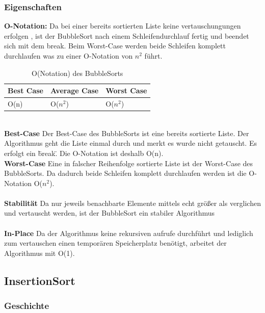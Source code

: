 \documentclass{article}
\begin{document}
\subsubsection{Eigenschaften}
\textbf{O-Notation:} Da bei einer bereits sortierten Liste keine vertauschungungen erfolgen , ist der BubbleSort nach einem Schleifendurchlauf fertig und beendet sich mit dem break. Beim Worst-Case werden beide Schleifen komplett durchlaufen was zu einer O-Notation von $n^{2}$ führt.
\begin{table}[h]
\centering
\begin{tabular}{lll}
	\hline
	\textbf{Best Case} & \textbf{Average Case} & \textbf{Worst Case} \\
	\hline
	O(n) & O($n^{2}$) & O($n^{2}$) \\
	\hline
\end{tabular}
\caption{O(Notation) des BubbleSorts \cite{ONotationen}}
\label{tab:bubbleSort}
\end{table}
\\\textbf{Best-Case} Der Best-Case des BubbleSorts ist eine bereits sortierte Liste. Der Algorithmus geht die Liste einmal durch und merkt es wurde nicht getauscht. Es erfolgt ein \"break\". Die O-Notation ist deshalb O(n).\\
\textbf{Worst-Case} Eine in falscher Reihenfolge sortierte Liste ist der Worst-Case des BubbleSorts. Da dadurch beide Schleifen komplett durchlaufen werden ist die O-Notation O($n^{2}$). \\ \\
\textbf{Stabilität} Da nur jeweils benachbarte Elemente mittels echt größer als verglichen und vertauscht werden, ist der BubbleSort ein stabiler Algorithmus \\ \\
\textbf{In-Place} Da der Algorithmus keine rekursiven aufrufe durchführt und lediglich zum vertauschen einen temporären Speicherplatz benötigt, arbeitet der Algorithmus mit O(1). \\





\subsection{InsertionSort}
\subsubsection{Geschichte}
\end{document}
